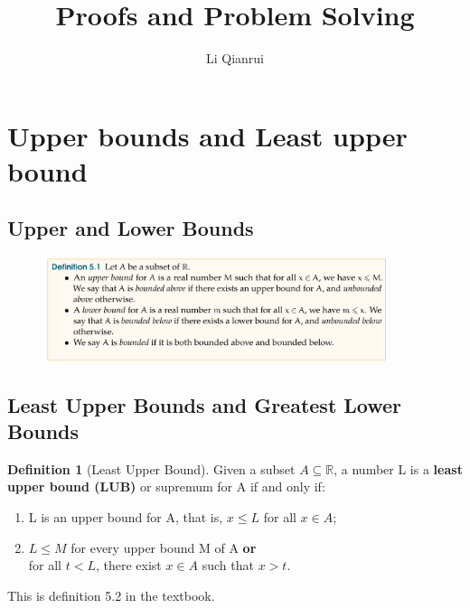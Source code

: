 \documentclass{article}
\title{Proofs and Problem Solving}
\author{Li Qianrui}
\theoremstyle{definition}
\newtheorem{definition}{Definition}[section]
\theoremstyle{definition}
\theoremstyle{remark}
\begin{document}
\maketitle
\tableofcontents

\newpage

\section{Upper bounds and Least upper bound}

\subsection{Upper and Lower Bounds}

\begin{figure}[h]
    \centering
    \includegraphics[width=0.9\textwidth]{Definition5.1}\\
\end{figure}

\subsection{Least Upper Bounds and Greatest Lower Bounds}

\begin{definition}[Least Upper Bound]
Given a subset $A\subseteq \mathbb{R}$, a number L is a \textbf{least upper bound (LUB)} or supremum for A if and only if:
\begin{enumerate}
	\item L is an upper bound for A, that is, $x\leq L$ for all $x\in A$;\\
	\item $L\leq M$ for every upper bound M of A \textbf{or} \\ for all $t < L$, there exist $x\in A$ such that $x>t$.\\
\end{enumerate}
This is definition 5.2 in the textbook.
\end{definition}
\end{document}

